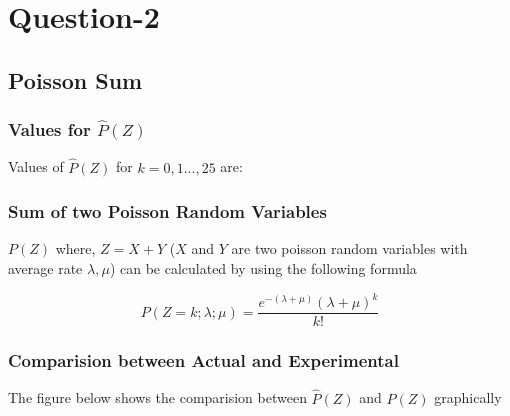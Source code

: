 \documentclass[a4paper]{article}
\begin{document}
\clearpage


\section{Question-2}


\subsection{Poisson Sum}
\subsubsection{Values for $\hat{P}(Z)$}
Values of $\hat{P}(Z)$ for $k=0, 1 ... ,25$ are:


\vspace{1.2em}

\subsubsection{Sum of two Poisson Random Variables}

$P(Z)$ where, $Z=X+Y$ ($X$ and $Y$ are two poisson random variables with average rate $\lambda, \mu$) can be calculated by using the following formula

$$ P(Z=k; \lambda;\mu) = \frac{e^{-(\lambda + \mu)}{(\lambda + \mu)}^{k}} {k!}$$ 
 
\clearpage

\subsubsection{Comparision between Actual and Experimental}
The figure below shows the comparision between $\hat{P}(Z)$ and $P(Z)$ graphically

\begin{figure}[H]
	\centering
	\begin{floatrow}
	\end{floatrow}
\end{figure}
\end{document}
